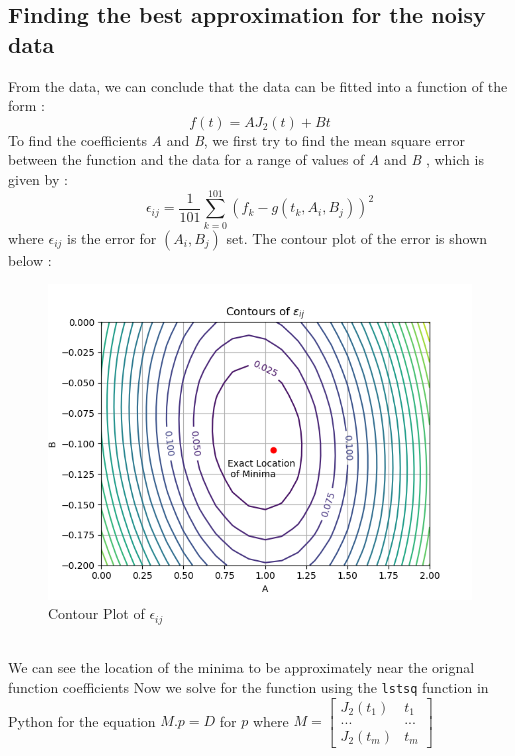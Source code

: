 \documentclass[11pt, a4paper]{article}
\begin{document}
\subsection{Finding the best approximation for the noisy data}
From the data, we can conclude that the data can be fitted into a function of the form :
\begin{equation*}
    f(t) = AJ_2(t)+Bt
\end{equation*}
To find the coefficients \textit{A} and \textit{B}, we first try to find the mean square error between the function and the data for a range of values of \textit{A} and \textit{B}
, which is given by :
\begin{equation*}
\epsilon_{ij} = \frac{1}{101}\sum_{k=0}^{101}(f_k - g(t_k,A_i,B_j))^2
\end{equation*}
where $\epsilon_{ij}$ is the error for $(A_i,B_j)$ set. The contour plot of the error is shown below :
\begin{figure}[!tbh]
    \centering
    \includegraphics[scale=0.5]{./../Extras/Contour.png}  %
    \caption{Contour Plot of $\epsilon_{ij}$}
    \label{fig:contour}
\end{figure}
\\We can see the location of the minima to be approximately near the orignal function coefficients
Now we solve for the function using the \texttt{lstsq} function in Python for the equation 
$M.p = D$ for $p$ where $M=\left[\begin{matrix}
    J_2(t_1)&t_1\\
    ...&...\\
    J_2(t_m)&t_m
\end{matrix}\right]$
\end{document}
